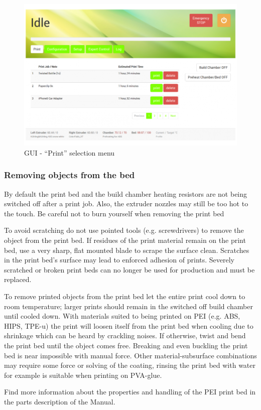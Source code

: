 \begin{figure}[H]
  \centering
  \includegraphics[width=.7\linewidth]{./img/gui_printtab_v110.png}
  \caption{GUI - “Print” selection menu}
\end{figure}

\subsubsection{Removing objects from the bed}

\begin{danger}
  By default the print bed and the build chamber heating resistors are not being switched off after a print job. Also, the extruder nozzles may still be too hot to the touch. Be careful not to burn yourself when removing the print bed
\end{danger}

\begin{notice}
  To avoid scratching do not use pointed tools (e.g. screwdrivers) to remove the object from the print bed.
  If residues of the print material remain on the print bed, use a very sharp, flat mounted blade to scrape the surface clean.
  Scratches in the print bed's surface may lead to enforced adhesion of prints. Severely scratched or broken print beds can no longer be used for production and must be replaced. 
\end{notice}

To remove printed objects from the print bed let the entire print cool down to room temperature; larger prints should remain in the switched off build chamber until cooled down.
With materials suited to being printed on PEI (e.g. ABS, HIPS, TPE-u) the print will loosen itself from the print bed when cooling due to shrinkage which can be heard by crackling noises. If otherwise, twist and bend the print bed until the object comes free. Breaking and even buckling the print bed is near impossible with manual force.
Other material-subsurface combinations may require some force or solving of the coating, rinsing the print bed with water for example is suitable when printing on PVA-glue.

Find more information about the properties and handling of the PEI print bed in the parts description of the Manual.


 
